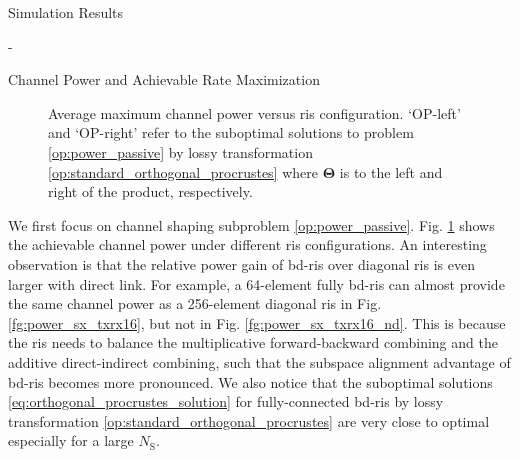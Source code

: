 \begin{section}{Simulation Results}
\begin{subsection}{-}

		\begin{subsubsection}{Channel Power and Achievable Rate Maximization}
			\begin{figure}[H]
				\centering
				\caption{
					Average maximum channel power versus \gls{ris} configuration.
					`OP-left' and `OP-right' refer to the suboptimal solutions to problem \eqref{op:power_passive} by lossy transformation \eqref{op:standard_orthogonal_procrustes} where $\mathbf{\Theta}$ is to the left and right of the product, respectively.
				}
				\label{fg:power_sx}
			\end{figure}

			We first focus on channel shaping subproblem \eqref{op:power_passive}.
			Fig. \ref{fg:power_sx} shows the achievable channel power under different \gls{ris} configurations.
			An interesting observation is that the relative power gain of \gls{bd}-\gls{ris} over diagonal \gls{ris} is even larger with direct link.
			For example, a 64-element fully \gls{bd}-\gls{ris} can almost provide the same channel power as a 256-element diagonal \gls{ris} in Fig. \ref{fg:power_sx_txrx16}, but not in Fig. \ref{fg:power_sx_txrx16_nd}.
			This is because the \gls{ris} needs to balance the multiplicative forward-backward combining and the additive direct-indirect combining, such that the subspace alignment advantage of \gls{bd}-\gls{ris} becomes more pronounced.
			We also notice that the suboptimal solutions \eqref{eq:orthogonal_procrustes_solution} for fully-connected \gls{bd}-\gls{ris} by lossy transformation \eqref{op:standard_orthogonal_procrustes} are very close to optimal especially for a large $N_\mathrm{S}$.


\end{subsubsection}
\end{subsection}
\end{section}
